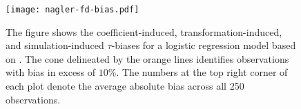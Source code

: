 \documentclass[11pt]{article}
\begin{document}



\begin{figure}[h!]
\begin{center}
\texttt{[image: nagler-fd-bias.pdf]}\\
\vspace{.1in}
\caption{The figure shows the coefficient-induced, transformation-induced, and  simulation-induced $\tau$-biases for a logistic regression model based on \cite{BerryDeMerittEsarey2010}. The cone delineated by the orange lines identifies observations with bias in excess of $10\%$. The numbers at the top right corner of each plot denote the average absolute bias across all 250 observations.}\label{fig:nagler}
\end{center}
\end{figure}
\end{document}
